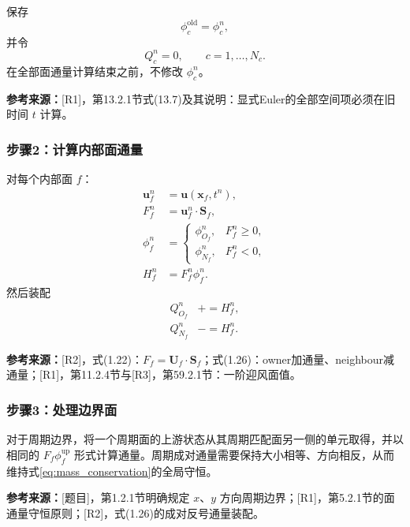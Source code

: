 \documentclass[UTF8,12pt,a4paper]{ctexart}
\numberwithin{equation}{section}
\newcommand{\Rone}{\textnormal{[R1]}}
\newcommand{\Rtwo}{\textnormal{[R2]}}
\newcommand{\Rthree}{\textnormal{[R3]}}
\newcommand{\Task}{\textnormal{[题目]}}
\newcommand{\source}[1]{%
  \par\smallskip
  \noindent\colorbox{sourcebg}{%
    \parbox{0.955\linewidth}{\footnotesize\color{sourcegray}\textbf{参考来源：}#1}%
  }
  \par\smallskip
}
\begin{document}
保存
\begin{equation}
  \phi_c^{\mathrm{old}}=\phi_c^n,
  \label{eq:freeze_old}
\end{equation}
并令
\begin{equation}
  Q_c^n=0,
  \qquad c=1,\ldots,N_c.
  \label{eq:zero_residual}
\end{equation}
在全部面通量计算结束之前，不修改 $\phi_c^n$。

\source{\Rone，第13.2.1节式(13.7)及其说明：显式Euler的全部空间项必须在旧时间 $t$ 计算。}

\subsubsection*{步骤2：计算内部面通量}

对每个内部面 $f$：
\begin{align}
  \bm u_f^n&=\bm u(\bm x_f,t^n),
  \label{eq:solver_uf}\\
  F_f^n&=\bm u_f^n\cdot\bm S_f,
  \label{eq:solver_F}\\
  \phi_f^n&=
  \begin{cases}
    \phi_{O_f}^n,&F_f^n\ge0,\\
    \phi_{N_f}^n,&F_f^n<0,
  \end{cases}
  \label{eq:solver_face_value}\\
  H_f^n&=F_f^n\phi_f^n.
  \label{eq:solver_H}
\end{align}
然后装配
\begin{align}
  Q_{O_f}^n&\mathrel{+}=H_f^n,
  \label{eq:solver_owner}\\
  Q_{N_f}^n&\mathrel{-}=H_f^n.
  \label{eq:solver_neighbour}
\end{align}

\source{\Rtwo，式(1.22)：$F_f=\bm U_f\cdot\bm S_f$；式(1.26)：owner加通量、neighbour减通量；\Rone，第11.2.4节与\Rthree，第59.2.1节：一阶迎风面值。}

\subsubsection*{步骤3：处理边界面}

对于周期边界，将一个周期面的上游状态从其周期匹配面另一侧的单元取得，并以相同的 $F_f\phi_f^{\mathrm{up}}$ 形式计算通量。周期成对通量需要保持大小相等、方向相反，从而维持式\eqref{eq:mass_conservation}的全局守恒。

\source{\Task，第1.2.1节明确规定 $x$、$y$ 方向周期边界；\Rone，第5.2.1节的面通量守恒原则；\Rtwo，式(1.26)的成对反号通量装配。}
\end{document}
